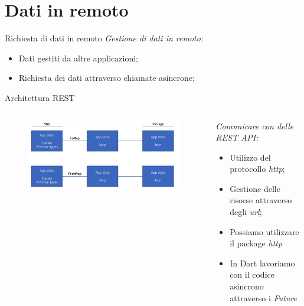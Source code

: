 \documentclass{../libs/presentation_format}
\begin{document}

\section{Dati in remoto}
\begin{frame}{Richiesta di dati in remoto}
	\emph{Gestione di dati in remoto:}
	\begin{itemize}
		\item Dati gestiti da altre applicazioni;
		\item Richiesta dei dati attraverso chiamate asincrone;
	\end{itemize}
\end{frame}


\begin{frame}{Architettura REST}
	\begin{minipage}[0.2\textheight]{\textwidth}
		\begin{columns}[T]
			\begin{column}{0.4\textwidth}
				\begin{figure}[htpb]
					\centering
					\includegraphics[scale=0.18]{../libs/hydrated-bloc-flow}
				\end{figure}
			\end{column}
			\begin{column}{0.6\textwidth}
				\emph{Comunicare con delle REST API:}
				\begin{itemize}
					\item Utilizzo del protocollo \emph{http};
					\item Gestione delle risorse attraverso degli \emph{url};
					\item Possiamo utilizzare il package \emph{http} \href{https://pub.dev/packages/http}{}
					\item In Dart lavoriamo con il codice asincrono attraverso i \emph{Future} \href{https://dart.dev/codelabs/async-await}{}
				\end{itemize}
			\end{column}
		\end{columns}
	\end{minipage}
\end{frame}
\end{document}
